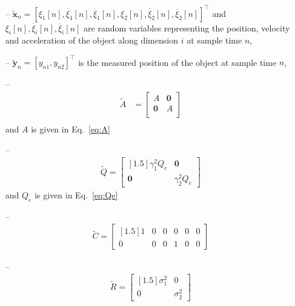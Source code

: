 \documentclass[fleqn,12pt]{article}
\begin{document}
\begin{itemize}

    \item[--]
        $\tilde{\mathbf{x}}_n=\left[\xi_1[n],\dot{\xi_1}[n],\ddot{\xi_1}[n],\xi_2[n],\dot{\xi_2}[n],\ddot{\xi_2}[n]\right]^\intercal$
        and $\xi_i[n],\dot{\xi_i}[n],\ddot{\xi_i}[n]$ are random variables representing
        the position, velocity and acceleration of the object along dimension
        $i$ at sample time
        $n$,

    \item[--] $\tilde{\mathbf{y}}_n=[y_{n1},y_{n2}]^\intercal$ is
        the measured position of the object at sample time $n$,

    \item[--]
        \begin{align*}
            \tilde{A}&=\begin{bmatrix}
                A & \mathbf{0}\\
                \mathbf{0} & A\\
            \end{bmatrix}\nonumber\\
        \end{align*}
        and $A$ is given in Eq.~\ref{eq:A}

    \item[--]
        \begin{align}
            \tilde{Q}=\begin{bmatrix}[1.5]
                \gamma^2_1Q_e & \mathbf{0}\\
                \mathbf{0} & \gamma^2_2Q_e
            \end{bmatrix}
            \label{eq:Qtilde}
        \end{align}
        and $Q_e$ is given in Eq.~\ref{eq:Qe}

    \item[--]
        \begin{align*}
            \tilde{C}=\begin{bmatrix}[1.5]
                1 & 0 & 0 & 0 & 0 & 0\\
                0 & 0 & 0 & 1 & 0 & 0
            \end{bmatrix}
        \end{align*}

    \item[--]
        \begin{align}
            \tilde{R}=\begin{bmatrix}[1.5]
                \sigma^2_1 & 0\\
                0 & \sigma^2_2
            \end{bmatrix}
            \label{eq:Rtilde}
        \end{align}
\end{itemize}
\end{document}
